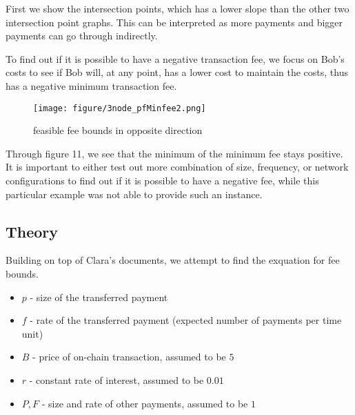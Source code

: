 \documentclass[twocolumn,10pt]{report}
\begin{document}
First we show the intersection points, which has a lower slope than the other two intersection point graphs. This can be interpreted as more payments and bigger payments can go through indirectly. 

To find out if it is possible to have a negative transaction fee, we focus on Bob's costs to see if Bob will, at any point, has a lower cost to maintain the costs, thus has a negative minimum transaction fee. 

\begin{figure}[t]
    \begin{center}
    \setlength{\unitlength}{0.012500in}%
    \texttt{[image: figure/3node\_pfMinfee2.png]}
    \end{center}
    \caption{feasible fee bounds in opposite direction}
    \label{figure_3Node11} 
    \end{figure}

Through figure 11, we see that the minimum of the minimum fee stays positive. It is important to either test out more combination of size, frequency, or network configurations to find out if it is possible to have a negative fee, while this particular example was not able to provide such an instance. 


\subsection{Theory}
Building on top of Clara's documents, we attempt to find the exquation for fee bounds. 

\begin{itemize}
    \item $p$ - size of the transferred payment
    \item $f$ - rate of the transferred payment (expected number of payments per time unit)
    \item $B$ - price of on-chain transaction, assumed to be $5$
    \item $r$ - constant rate of interest, assumed to be $0.01$
    \item $P,F$ - size and rate of other payments, assumed to be $1$
\end{itemize}
\end{document}
